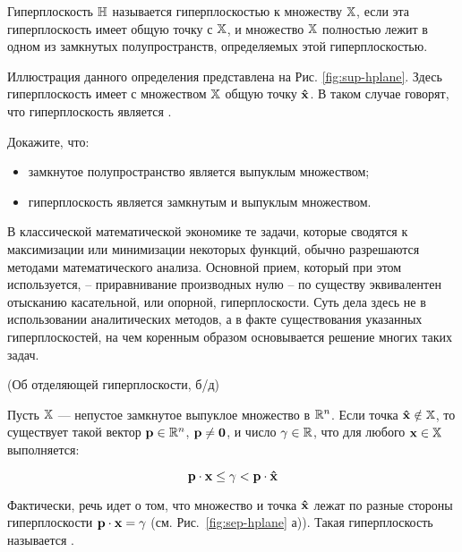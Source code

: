 \begin{dfn}

Гиперплоскость $\mathbb{H}$ называется  гиперплоскостью к
множеству $\mathbb{X}$, если эта гиперплоскость имеет общую точку с
$\mathbb{X}$, и множество $\mathbb{X}$ полностью лежит в одном из замкнутых
полупространств, определяемых этой гиперплоскостью.\end{dfn}

Иллюстрация данного определения представлена на Рис.
\ref{fig:sup-hplane}. Здесь гиперплоскость имеет с множеством
$\mathbb{X}$ общую точку $\mathbf{\hat x}$. В таком случае говорят, что
гиперплоскость является .



\begin{exer}
Докажите, что:
\begin{itemize}
  \item замкнутое полупространство является выпуклым множеством;
  \item гиперплоскость является замкнутым и выпуклым множеством.
\end{itemize}
\end{exer}

В классической математической экономике те задачи, которые сводятся
к максимизации или минимизации некоторых функций, обычно разрешаются
методами математического анализа. Основной прием, который при этом
используется, -- приравнивание производных нулю -- по существу
эквивалентен отысканию касательной, или опорной, гиперплоскости.
Суть дела здесь не в использовании аналитических методов, а в факте
существования указанных гиперплоскостей, на чем коренным образом
основывается решение многих таких задач.


\begin{teo}(Об отделяющей гиперплоскости, б/д)
\label{teo:sep-hplane}

Пусть $\mathbb{X}$ --- непустое замкнутое выпуклое множество в $\mathbb{R}^n$.
Если точка $\mathbf{\hat x} \notin \mathbb{X}$, то существует такой вектор
$\mathbf{p} \in \mathbb{R}^n$, $\mathbf{p} \neq \mathbf{0}$, и число $\gamma \in \mathbb{R}$,
что для любого $\mathbf{x} \in \mathbb{X}$ выполняется:

\[\mathbf{p} \cdot \mathbf{x} \leq \gamma < \mathbf{p} \cdot \mathbf{\hat x}\]
\end{teo}

Фактически, речь идет о том, что множество  и точка $\mathbf{\hat x}$
лежат по разные стороны гиперплоскости $\mathbf{p} \cdot \mathbf{x} =
\gamma$ (см. Рис.~\ref{fig:sep-hplane} а)). Такая гиперплоскость
называется .

